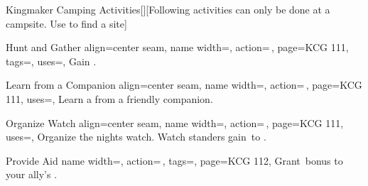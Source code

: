 \begin{PageFront}
\begin{Tables}{\frontTableHeight}
\begin{Table}{Kingmaker Camping Activities}[][Following activities can only be done at a campsite. Use
         to find a site]
\begin{entry}{Hunt and Gather}
{                align=center seam,
                name width=\activityLength,%
                action=\,,
                page=KCG 111,
                tags=\Move,
                uses={},
            }
                Gain . \hfill
                \\
                \hfill
                \hfill
            \end{entry}
            \begin{entry}{Learn from a Companion}{%
                align=center seam,
                name width=\activityLength,%
                action=\,,
                page=KCG 111,
                uses={\Perception[][val=20]},
            }
                Learn a  from a friendly companion. \hfill {}\\ \hfill {}
            \end{entry}
            \begin{entry}{Organize Watch}{%
                align=center seam,
                name width=\activityLength,%
                action=\,,
                page=KCG 111,
                uses={\Perception[tags=E]},
            }
                Organize the nights watch. Watch standers gain \,\Status to \PerceptionT. \\
                 \hfill
                \quad {}
            \end{entry}
            \begin{entry}{Provide Aid}{%
                name width=\activityLength,%
                action=\,,
                tags=\Concentrate,
                page=KCG 112,
            }
                Grant \,\Cirm bonus to your ally's . \hfill
                \quad
            \end{entry}

\end{Table}
\end{Tables}
\end{PageFront}
